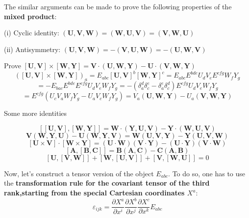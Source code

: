 The similar arguments can be made to prove the following properties of the \textbf{mixed product}:
\begin{qt}
(i) Cyclic identity: $(\mathbf{U}, \mathbf{V}, \mathbf{W})=(\mathbf{W}, \mathbf{U}, \mathbf{V})=(\mathbf{V}, \mathbf{W}, \mathbf{U})$

(ii) Antisymmetry: $(\mathbf{U}, \mathbf{V}, \mathbf{W})=-(\mathbf{V}, \mathbf{U}, \mathbf{W})=-(\mathbf{U}, \mathbf{W}, \mathbf{V})$
\end{qt}
\begin{example}
Prove $[\mathbf{U}, \mathbf{V}] \times[\mathbf{W}, \mathbf{Y}]=\mathbf{V} \cdot(\mathbf{U}, \mathbf{W}, \mathbf{Y})-\mathbf{U} \cdot(\mathbf{V}, \mathbf{W}, \mathbf{Y})$
$$
([\mathbf{U}, \mathbf{V}] \times[\mathbf{W}, \mathbf{Y}])_{a}=E_{a b c}[\mathbf{U}, \mathbf{V}]^{b}[\mathbf{W}, \mathbf{Y}]^{c}=E_{a b c} E^{b d e} U_{d} V_{e} E^{c f g} W_{f} Y_{g}
$$
$$
=-E_{b a c} E^{b d e} E^{c f g} U_{d} V_{e} W_{f} Y_{g}=-\left(\delta_{a}^{d} \delta_{c}^{e}-\delta_{a}^{e} \delta_{c}^{d}\right) E^{c f g} U_{d} V_{e} W_{f} Y_{g}
$$
$$
=E^{c f g}\left(U_{c} V_{a} W_{f} Y_{g}-U_{a} V_{c} W_{f} Y_{g}\right)=V_{a}(\mathbf{U}, \mathbf{W}, \mathbf{Y})-U_{a}(\mathbf{V}, \mathbf{W}, \mathbf{Y})
$$
\end{example}
Some more identities
\begin{qt}
$$
[[\mathbf{U}, \mathbf{V}],[\mathbf{W}, \mathbf{Y}]]=\mathbf{W} \cdot(\mathbf{Y}, \mathbf{U}, \mathbf{V})-\mathbf{Y} \cdot(\mathbf{W}, \mathbf{U}, \mathbf{V})
$$
$$
\mathbf{V}(\mathbf{W}, \mathbf{Y}, \mathbf{U})-\mathbf{U}(\mathbf{W}, \mathbf{Y}, \mathbf{V})=\mathbf{W}(\mathbf{U}, \mathbf{V}, \mathbf{Y})-\mathbf{Y}(\mathbf{U}, \mathbf{V}, \mathbf{W})
$$
$$
[\mathbf{U} \times \mathbf{V}] \cdot[\mathbf{W} \times \mathbf{Y}]=(\mathbf{U} \cdot \mathbf{W})(\mathbf{V} \cdot \mathbf{Y})-(\mathbf{U} \cdot \mathbf{Y})(\mathbf{V} \cdot \mathbf{W})
$$
$$
[\mathbf{A},[\mathbf{B}, \mathbf{C}]]=\mathbf{B}(\mathbf{A}, \mathbf{C})-\mathbf{C}(\mathbf{A}, \mathbf{B})
$$
$$
[\mathbf{U},[\mathbf{V}, \mathbf{W}]]+[\mathbf{W},[\mathbf{U}, \mathbf{V}]]+[\mathbf{V},[\mathbf{W}, \mathbf{U}]]=0
$$
\end{qt}
Now, let's construct a tensor version of the object $E_{abc}$. To do so, one has to use the \textbf{transformation rule for the covariant tensor of the third rank,starting from the special Cartesian coordinates $X^a$}:
\begin{equation}
\varepsilon_{i j k}=\frac{\partial X^{a}}{\partial x^{i}} \frac{\partial X^{b}}{\partial x^{j}} \frac{\partial X^{c}}{\partial x^{k}} E_{a b c}
\end{equation}
